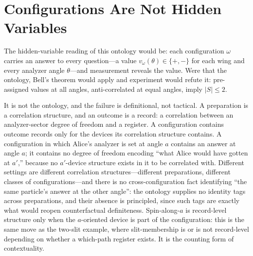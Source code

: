 \documentclass[11pt]{article}
\theoremstyle{definition}
\theoremstyle{remark}
\begin{document}
\section{Configurations Are Not Hidden Variables}\label{sec:nohv}
The hidden-variable reading of this ontology would be: each configuration $\omega$ carries an answer to every question---a value $v_\omega(\theta) \in \{+,-\}$ for each wing and every analyzer angle $\theta$---and measurement reveals the value. Were that the ontology, Bell's theorem would apply and experiment would refute it: pre-assigned values at all angles, anti-correlated at equal angles, imply $|S| \le 2$.

It is not the ontology, and the failure is definitional, not tactical. A preparation is a correlation structure, and an outcome is a record: a correlation between an analyzer-sector degree of freedom and a register. A configuration contains outcome records only for the devices its correlation structure contains. A configuration in which Alice's analyzer is set at angle $a$ contains an answer at angle $a$; it contains no degree of freedom encoding ``what Alice would have gotten at $a'$,'' because no $a'$-device structure exists in it to be correlated with. Different settings are different correlation structures---different preparations, different classes of configurations---and there is no cross-configuration fact identifying ``the same particle's answer at the other angle'': the ontology supplies no identity tags across preparations, and their absence is principled, since such tags are exactly what would reopen counterfactual definiteness. Spin-along-$a$ is record-level structure only when the $a$-oriented device is part of the configuration: this is the same move as the two-slit example, where slit-membership is or is not record-level depending on whether a which-path register exists. It is the counting form of contextuality.
\end{document}
